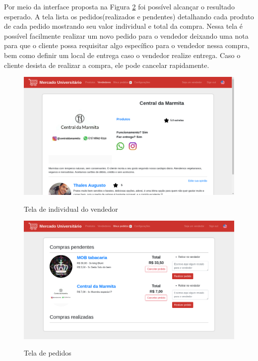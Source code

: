 Por meio da interface proposta na Figura \ref{fig:pedidos} foi possível alcançar o resultado esperado. A tela lista os pedidos(realizados e pendentes) detalhando cada produto de cada pedido mostrando seu valor individual e total da compra. Nessa tela é possível facilmente realizar um novo pedido para o vendedor deixando uma nota para que o cliente possa requisitar algo específico para o vendedor nessa compra, bem como definir um local de entrega caso o vendedor realize entrega. Caso o cliente desista de realizar a compra, ele pode cancelar rapidamente.

\begin{figure}[htbp!]
  \centering
  \caption{Tela de individual do vendedor}
  \includegraphics[width=1\textwidth]{figs/resultado/vendedor.png}
    \label{fig:vendedor}
\end{figure}

\begin{figure}[htbp!]
  \centering
  \caption{Tela de pedidos}
  \includegraphics[width=1\textwidth]{figs/resultado/carrinho.png}
    \label{fig:pedidos}
\end{figure}

